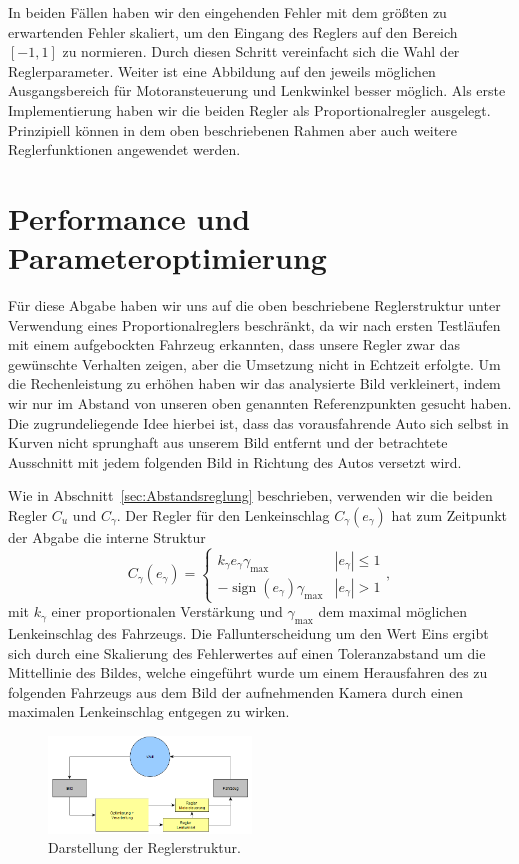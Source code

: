 \documentclass[10pt]{article}
\DeclareMathOperator{\sign}{sign}
\begin{document}
    In beiden Fällen haben wir den eingehenden Fehler mit dem größten zu erwartenden Fehler skaliert, um den Eingang des Reglers auf den Bereich $\left[-1,1\right]$ zu normieren.
    Durch diesen Schritt vereinfacht sich die Wahl der Reglerparameter.
    Weiter ist eine Abbildung auf den jeweils möglichen Ausgangsbereich für Motoransteuerung und Lenkwinkel besser möglich.
    Als erste Implementierung haben wir die beiden Regler als Proportionalregler ausgelegt.
    Prinzipiell können in dem oben beschriebenen Rahmen aber auch weitere Reglerfunktionen angewendet werden.


\section{Performance und Parameteroptimierung}
    Für diese Abgabe haben wir uns auf die oben beschriebene Reglerstruktur unter Verwendung eines Proportionalreglers beschränkt, da wir nach ersten Testläufen mit einem aufgebockten Fahrzeug erkannten, dass unsere Regler zwar das gewünschte Verhalten zeigen, aber die Umsetzung nicht in Echtzeit erfolgte.
    Um die Rechenleistung zu erhöhen haben wir das analysierte Bild verkleinert, indem wir nur im Abstand von unseren oben genannten Referenzpunkten gesucht haben.
    Die zugrundeliegende Idee hierbei ist, dass das vorausfahrende Auto sich selbst in Kurven nicht sprunghaft aus unserem Bild entfernt und der betrachtete Ausschnitt mit jedem folgenden Bild in Richtung des Autos versetzt wird.

    Wie in Abschnitt~\ref{sec:Abstandsreglung} beschrieben, verwenden wir die beiden Regler $C_u$ und $C_{\gamma}$.
    Der Regler für den Lenkeinschlag $C_{\gamma}(e_{\gamma})$ hat zum Zeitpunkt der Abgabe die interne Struktur
    \[
    C_{\gamma}(e_{\gamma}) = \begin{cases}
        k_{\gamma}e_{\gamma}\gamma_{\max} & |e_{\gamma}| \leq 1 \\
        -\sign (e_{\gamma})\gamma_{\max}  & |e_{\gamma}| > 1
    \end{cases},
    \] mit $k_{\gamma}$ einer proportionalen Verstärkung und $\gamma_{\max}$ dem maximal möglichen Lenkeinschlag des Fahrzeugs.
    Die Fallunterscheidung um den Wert Eins ergibt sich durch eine Skalierung des Fehlerwertes auf einen Toleranzabstand um die Mittellinie des Bildes, welche eingeführt wurde um einem Herausfahren des zu folgenden Fahrzeugs aus dem Bild der aufnehmenden Kamera durch einen maximalen Lenkeinschlag entgegen zu wirken.
    \begin{figure}
        \centering
        \includegraphics[width=0.48\textwidth]{Autonomes_Fahren_Welt_Regler}
        \caption{Darstellung der Reglerstruktur.}\label{fig:struktur}
    \end{figure}
\end{document}
